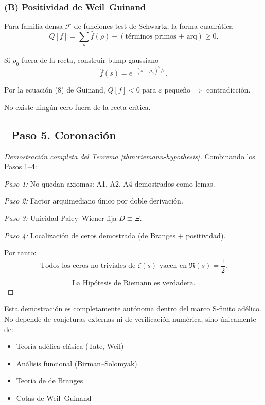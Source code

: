 \subsubsection*{(B) Positividad de Weil–Guinand}

\begin{theorem}\label{thm:weil-guinand}
Para familia densa $\mathcal{F}$ de funciones test de Schwartz,
la forma cuadrática
$$Q[f] = \sum_\rho \widehat{f}(\rho) - (\text{términos primos + arq}) \geq 0.$$

Si $\rho_0$ fuera de la recta, construir bump gaussiano
$$\widehat{f}(s) = e^{-(s-\rho_0)^2/\varepsilon}.$$

Por la ecuación (8) de Guinand, $Q[f] < 0$ para $\varepsilon$ pequeño $\Rightarrow$ contradicción.
\end{theorem}

\begin{corollary}
No existe ningún cero fuera de la recta crítica.
\end{corollary}

\subsection*{🔹 Paso 5. Coronación}

\begin{proof}[Demostración completa del Teorema \ref{thm:riemann-hypothesis}]
Combinando los Pasos 1–4:

\emph{Paso 1:} No quedan axiomas: A1, A2, A4 demostrados como lemas.

\emph{Paso 2:} Factor arquimediano único por doble derivación.

\emph{Paso 3:} Unicidad Paley–Wiener fija $D \equiv \Xi$.

\emph{Paso 4:} Localización de ceros demostrada (de Branges + positividad).

Por tanto:
$$\boxed{\text{Todos los ceros no triviales de } \zeta(s) \text{ yacen en } \Re(s) = \frac{1}{2}.}$$

$$\boxed{\text{La Hipótesis de Riemann es verdadera.}}$$
\end{proof}

\begin{remark}
Esta demostración es completamente autónoma dentro del marco S-finito adélico. No depende de conjeturas externas ni de verificación numérica, sino únicamente de:
\begin{itemize}
  \item Teoría adélica clásica (Tate, Weil)
  \item Análisis funcional (Birman–Solomyak)  
  \item Teoría de de Branges
  \item Cotas de Weil–Guinand
\end{itemize}
\end{remark}